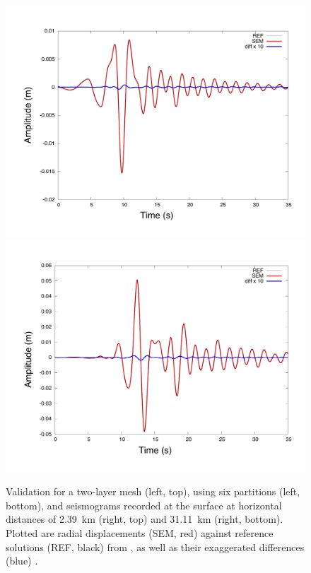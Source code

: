 \documentclass[referee,extra]{gji}
\renewcommand{\cite}[1]{\citet{#1}}
\begin{document}
\begin{figure}
\begin{center}
\begin{minipage}[t]{0.45\textwidth}
\includegraphics[width=1.\textwidth]{./images/2lay_traces55_R.pdf} \\
\includegraphics[width=1.\textwidth]{./images/2lay_traces31_R.pdf}
\end{minipage}
\end{center}
\caption{Validation for a two-layer mesh (left, top), using six partitions (left, bottom),
and seismograms recorded at the surface at horizontal distances of 2.39~km (right, top) and 31.11~km (right, bottom).
Plotted are radial displacements (SEM, red) against reference solutions (REF, black) from \cite{KoTr99},
as well as their exaggerated differences (blue) .
}
\label{figure:validation}
\end{figure}
\end{document}
